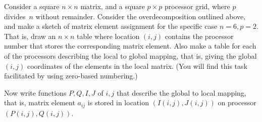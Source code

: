   Consider a square $n\times n$ matrix, and a square $p\times p$
  processor grid, where $p$ divides~$n$ without remainder. Consider
  the overdecomposition outlined above, and make a sketch of matrix
  element assignment for the specific case $n=6,p=2$. That is, draw an
  $n\times n$ table where location $(i,j)$ contains the processor
  number that stores the corresponding matrix element. Also make a
  table for each of the processors describing the local to global mapping,
  that is, giving the global $(i,j)$ coordinates of the elements in
  the local matrix. (You will find this task facilitated by using
  zero-based numbering.)

  Now write functions $P,Q,I,J$ of $i,j$ that describe the global to
  local mapping, that is, matrix element $a_{ij}$ is stored in
  location $(I(i,j),J(i,j))$ on processor $(P(i,j),Q(i,j))$.
